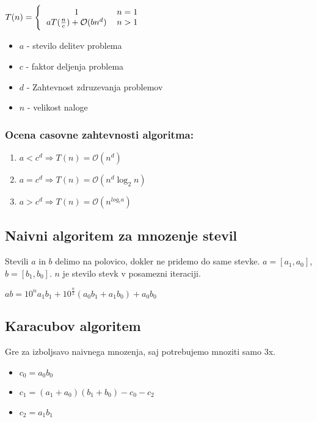 \documentclass{article}
\begin{document}
\begin{multicols}{2}
\begin{center}
    \begin{math}
        T(n) =
        \Bigg \{\begin{tabular}{ccc}
          $1$  & $n = 1$ & \\
          $a T(\frac{n}{c}) + \mathcal{O}(bn^d)$ & $n > 1$ & \\
        \end{tabular}
    \end{math} 
\end{center}

\begin{itemize}
    \item $a$ - stevilo delitev problema
    \item $c$ - faktor deljenja problema
    \item $d$ - Zahtevnost zdruzevanja problemov 
    \item $n$ - velikost naloge
\end{itemize}

\subsubsection{Ocena casovne zahtevnosti algoritma:}
\begin{enumerate}
    \item $a < c^d \Rightarrow T(n) = \mathcal{O}(n^d)$
    \item $a = c^d \Rightarrow T(n) = \mathcal{O}(n^d \log_2 n)$
    \item $a > c^d \Rightarrow T(n) = \mathcal{O}(n^{log_c a})$
\end{enumerate}

\subsection{Naivni algoritem za mnozenje stevil}
Stevili $a$ in $b$ delimo na polovico, dokler ne pridemo do same stevke.
$a = [a_1, a_0]$, $b =[b_1, b_0]$. $n$ je stevilo stevk v posamezni iteraciji.

\begin{center}
    \begin{math}
        ab = 10^n a_1 b_1 + 10^{\frac{n}{2}}(a_0 b_1 + a_1 b_0) + a_0 b_0
    \end{math}
\end{center}

\subsection{Karacubov algoritem}
Gre za izboljsavo naivnega mnozenja, saj potrebujemo mnoziti samo 3x.
\begin{itemize}
    \item $c_0 = a_0 b_0$
    \item $c_1 = (a_1 + a_0) (b_1 + b_0) - c_0 - c_2$
    \item $c_2 = a_1 b_1$
\end{itemize}



\end{multicols}
\end{document}
